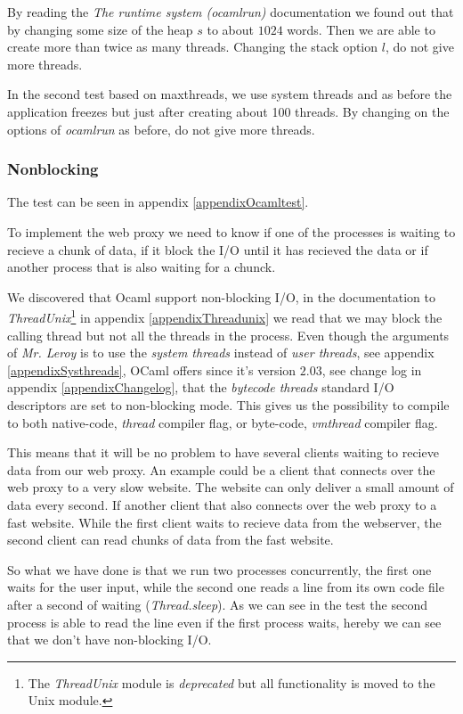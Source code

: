 \documentclass[a4paper,12pt]{article}
\begin{document}
By reading the {\it The runtime system (ocamlrun)} documentation we found
out that by changing some size of the heap $s$ to about $1024$ words. Then
we are able to create more than twice as many threads. Changing the stack
option $l$, do not give more threads.

In the second test based on maxthreads, we use system threads and as before
the application freezes but just after creating about 100 threads. By changing
on the options of {\it ocamlrun} as before, do not give more threads.

\subsubsection{Nonblocking}
The test can be seen in appendix \ref{appendixOcamltest}.

To implement the web proxy we need to know if one of the processes is waiting
to recieve a chunk of data, if it block the I/O until it has recieved the data
or if another process that is also waiting for a chunck.

We discovered that Ocaml support non-blocking I/O, in the documentation to
\emph{ThreadUnix}\footnote{The \emph{ThreadUnix} module is \emph{deprecated}
but all functionality is moved to the Unix module.} in appendix
\ref{appendixThreadunix} we read that we may block the calling thread but not
all the threads in the process. Even though the arguments of \emph{Mr. Leroy} is
to use the \emph{system threads} instead of \emph{user threads}, see appendix
\ref{appendixSysthreads}, OCaml offers since it's version $2.03$, see change log
in appendix \ref{appendixChangelog}, that the \emph{bytecode threads} standard
I/O descriptors are set to non-blocking mode. This gives us the possibility to
compile to both native-code, \emph{thread} compiler flag, or byte-code,
\emph{vmthread} compiler flag.

This means that  it will be no problem to have several clients waiting to
recieve data from our web proxy. An example could be a client that connects over
the web proxy to a very slow website. The website can only deliver a small
amount of data every second. If another client that also connects over the web
proxy to a fast website. While the first client waits to recieve data from the
webserver, the second client can read chunks of data from the fast website.

So what we have done is that we run two processes concurrently, the first one
waits for the user input, while the second one reads a line from its own
code file after a second of waiting (\emph{Thread.sleep}). As we can see in the
test the second process is able to read the line even if the first process waits,
hereby we can see that we don't have non-blocking I/O.
\end{document}
